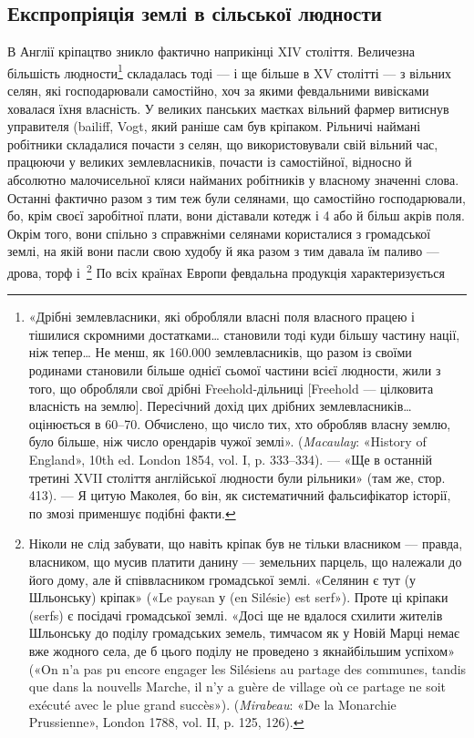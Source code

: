 \subsection{Експропріяція землі в сільської людности}

В Англії кріпацтво зникло фактично наприкінці XIV століття.
Величезна більшість людности\footnote{
«Дрібні землевласники, які обробляли власні поля власного працею
і тішилися скромними достатками\dots{} становили тоді куди більшу
частину нації, ніж тепер\dots{} Не менш, як \num{160.000} землевласників, що разом
із своїми родинами становили більше однієї сьомої частини всієї людности,
жили з того, що обробляли свої дрібні Freehold-дільниці [Freehold —
цілковита власність на землю]. Пересічний дохід цих дрібних землевласників\dots{}
оцінюється в 60--70. Обчислено, що число
тих, хто обробляв власну землю, було більше, ніж число орендарів чужої
землі». (\emph{Macaulay}: «History of England», 10th ed. London 1854,
vol. I, p. 333--334). — «Ще в останній третині XVII століття 
англійської людности були рільники» (там же, стор. 413). — Я цитую Маколея,
бо він, як систематичний фальсифікатор історії, по змозі применшує
подібні факти.
} складалась тоді — і ще
більше в XV столітті — з вільних селян, які господарювали
самостійно, хоч за якими февдальними вивісками ховалася їхня
власність. У великих панських маєтках вільний фармер витиснув
управителя (bailiff, Vogt, який раніше сам був кріпаком. Рільничі
наймані робітники складалися почасти з селян, що використовували
свій вільний час, працюючи у великих землевласників,
почасти із самостійної, відносно й абсолютно малочисельної
кляси найманих робітників у власному значенні слова. Останні
фактично разом з тим теж були селянами, що самостійно господарювали,
бо, крім своєї заробітної плати, вони діставали котедж
і 4 або й більш акрів поля. Окрім того, вони спільно з справжніми
селянами користалися з громадської землі, на якій вони пасли
свою худобу й яка разом з тим давала їм паливо — дрова, торф
і~\footnote{
Ніколи не слід забувати, що навіть кріпак був не тільки власником
— правда, власником, що мусив платити данину — земельних
парцель, що належали до його дому, але й співвласником громадської
землі. «Селянин є тут (у Шльонську) кріпак» («Le paysan у (en Silésie)
est serf»). Проте ці кріпаки (serfs) є посідачі громадської землі. «Досі
ще не вдалося схилити жителів Шльонську до поділу громадських
земель, тимчасом як у Новій Марці немає вже жодного села, де б цього
поділу не проведено з якнайбільшим успіхом» («On n’a pas pu encore
engager les Silésiens au partage des communes, tandis que dans la nouvells
Marche, il n’y a guère de village où ce partage ne soit exécuté avec le plue
grand succès»). (\emph{Mirabeau}: «De la Monarchie Prussienne», London 1788,
vol. II, p. 125, 126).
} По всіх країнах Европи февдальна продукція характеризується
